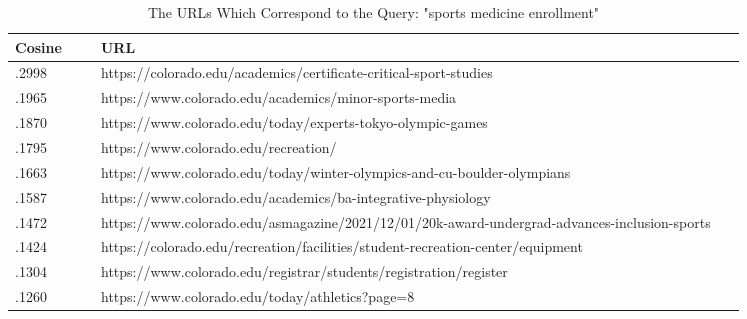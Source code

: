 \begin{table}[h]
\begin{tabular}{|p{0.1\linewidth} | p{0.75\linewidth}|}
\hline
\textbf{Cosine}  & \textbf{URL} \\ \hline
.2998       & https://colorado.edu/academics/certificate-critical-sport-studies \\ \hline
.1965      &  https://www.colorado.edu/academics/minor-sports-media \\ \hline
.1870       & https://www.colorado.edu/today/experts-tokyo-olympic-games \\ \hline
.1795       & https://www.colorado.edu/recreation/ \\ \hline
.1663        &  https://www.colorado.edu/today/winter-olympics-and-cu-boulder-olympians \\ \hline
.1587        & https://www.colorado.edu/academics/ba-integrative-physiology \\ \hline
.1472         & https://www.colorado.edu/asmagazine/2021/12/01/20k-award-undergrad-advances-inclusion-sports \\ \hline
.1424      & https://colorado.edu/recreation/facilities/student-recreation-center/equipment \\ \hline
.1304       & https://www.colorado.edu/registrar/students/registration/register \\ \hline
.1260        & https://www.colorado.edu/today/athletics?page=8 \\ \hline
\end{tabular}
\caption{The URLs Which Correspond to the Query: "sports medicine enrollment"}
\label{table:queryenrollmentappendix}
\end{table}